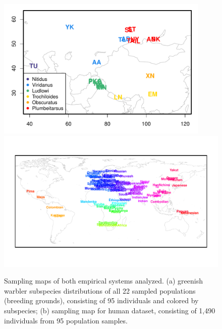 \documentclass[10pt,letterpaper]{article}
\begin{document}
\begin{figure}
	\centering
			{\includegraphics[width=4in,height=2.67in]{../figs/warblers/warbler_sampling_map.pdf}}
			{\includegraphics[width=\textwidth,height=0.6\textwidth]{../figs/globetrotter/globe_world_map_text.pdf}}
            \caption{
            Sampling maps of both empirical systems analyzed.  (a) greenish warbler subspecies distributions of all 22 sampled populations (breeding grounds), consisting of 95 individuals and colored by subspecies; (b) sampling map for human dataset, consisting of 1,490 individuals from 95 population samples.}
\label{sfig:empirical_maps}
\end{figure}
\end{document}
